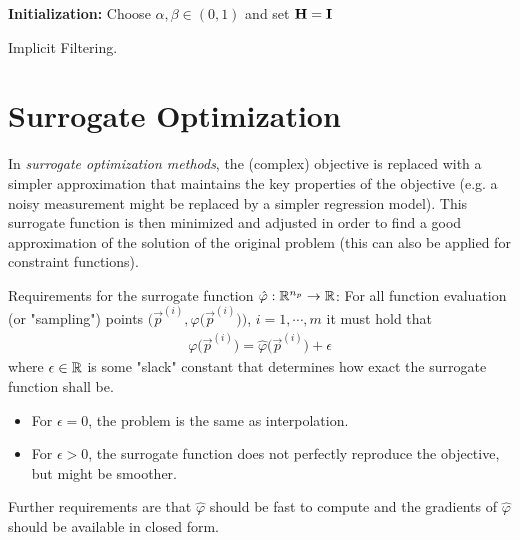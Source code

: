 			\begin{algorithm}  \DontPrintSemicolon
				\textbf{Initialization:} Choose \( \alpha, \beta \in (0, 1) \) and set \( \bm{\mathrm{H}} = \bm{\mathrm{I}} \) \;

				\caption{Implicit Filtering.}
				\label{alg:implicitFiltering}
			\end{algorithm}

	\section{Surrogate Optimization}
		In \emph{surrogate optimization methods}, the (complex) objective is replaced with a simpler approximation that maintains the key properties of the objective (e.g. a noisy measurement might be replaced by a simpler regression model). This surrogate function is then minimized and adjusted in order to find a good approximation of the solution of the original problem (this can also be applied for constraint functions).

		Requirements for the surrogate function \( \hat{\varphi} : \mathbb{R}^{n_p} \to \mathbb{R} \): For all function evaluation (or "sampling") points \( \Big( \vec{p}^{(i)}, \varphi\big(\vec{p}^{(i)}\big) \Big) \), \( i = 1, \cdots, m \) it must hold that
		\begin{align*}
			\varphi\big( \vec{p}^{(i)} \big) = \hat{\varphi}\big( \vec{p}^{(i)} \big) + \epsilon
		\end{align*}
		where \( \epsilon \in \mathbb{R} \) is some "slack" constant that determines how exact the surrogate function shall be.
		\begin{itemize}
			\item For \(\epsilon = 0\), the problem is the same as interpolation.
			\item For \(\epsilon > 0\), the surrogate function does not perfectly reproduce the objective, but might be smoother.
		\end{itemize}
		Further requirements are that \( \hat{\varphi} \) should be fast to compute and the gradients of \(\hat{\varphi}\) should be available in closed form.

